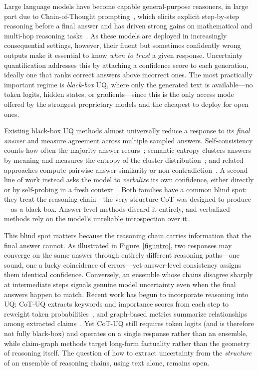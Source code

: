 \documentclass[twoside]{article}
\begin{document}
Large language models have become capable general-purpose reasoners, in
large part due to Chain-of-Thought prompting~\citep{wei2022chain}, which
elicits explicit step-by-step reasoning before a final answer and has driven
strong gains on mathematical and multi-hop reasoning tasks~\citep{wang2023selfconsistency, yao2023tree}.
As these models are deployed in increasingly consequential settings, however,
their fluent but sometimes confidently wrong outputs make it essential to know
\emph{when to trust} a given response. Uncertainty quantification addresses
this by attaching a confidence score to each generation, ideally one that ranks
correct answers above incorrect ones. The most practically important regime is
\emph{black-box} UQ, where only the generated text is available---no token
logits, hidden states, or gradients---since this is the only access mode offered
by the strongest proprietary models and the cheapest to deploy for open ones.

Existing black-box UQ methods almost universally reduce a response to its
\emph{final answer} and measure agreement across multiple sampled answers.
Self-consistency counts how often the majority answer recurs~\citep{wang2023selfconsistency};
semantic entropy clusters answers by meaning and measures the entropy of the
cluster distribution~\citep{kuhn2023semantic, farquhar2024detecting};
and related approaches compute pairwise answer similarity or
non-contradiction~\citep{lin2023generating, manakul2023selfcheckgpt, chen2024quantifying}.
A second line of work instead asks the model to \emph{verbalize} its own
confidence, either directly or by self-probing in a fresh
context~\citep{xiong2024llms, liu2024uait}. Both families have a common
blind spot: they treat the reasoning chain---the very structure CoT was designed
to produce---as a black box. Answer-level methods discard it entirely, and
verbalized methods rely on the model's unreliable introspection over it.



This blind spot matters because the reasoning chain carries information that the
final answer cannot. As illustrated in Figure~\ref{fig:intro}, two responses may
converge on the same answer through entirely different reasoning paths---one
sound, one a lucky coincidence of errors---yet answer-level consistency assigns
them identical confidence.
Conversely, an ensemble whose chains disagree sharply at intermediate steps
signals genuine model uncertainty even when the final answers happen to match.
Recent work has begun to incorporate reasoning into UQ: CoT-UQ extracts
keywords and importance scores from each step to reweight token
probabilities~\citep{zhang2025cotuq}, and graph-based metrics summarize
relationships among extracted claims~\citep{jiang2024graphuncertainty}. Yet
CoT-UQ still requires token logits (and is therefore not fully black-box) and
operates on a single response rather than an ensemble, while claim-graph methods
target long-form factuality rather than the geometry of reasoning itself. The
question of how to extract uncertainty from the \emph{structure} of an ensemble
of reasoning chains, using text alone, remains open.
\end{document}
